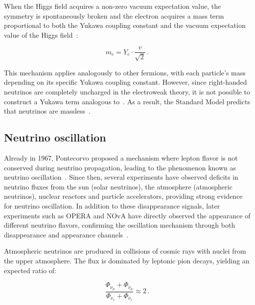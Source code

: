 When the Higgs field acquires a non-zero vacuum expectation value, the symmetry is spontaneously broken and the electron acquires a mass term proportional to both the Yukawa coupling constant and the vacuum expectation value of the Higgs field~\cite{bilenkij_introduction_2018, navas_review_2024}:

\begin{equation} 
\label{eq:electron_mass}
		m_e = Y_e \cdot \frac{v}{\sqrt{2}} \,.
\end{equation}


This mechanism applies analogously to other fermions, with each particle's mass depending on its specific Yukawa coupling constant. However, since right-handed neutrinos are completely uncharged in the electroweak theory, it is not possible to construct a Yukawa term analogous to~. As a result, the Standard Model predicts that neutrinos are massless~\cite{navas_review_2024}. 

\subsection{Neutrino oscillation}

Already in 1967, Pontecorvo proposed a mechanism where lepton flavor is not conserved during neutrino propagation, leading to the phenomenon known as neutrino oscillation~\cite{pontecorvo_neutrino_1968}. Since then, several experiments have observed deficits in neutrino fluxes from the sun (solar neutrinos), the atmosphere (atmospheric neutrinos), nuclear reactors and particle accelerators, providing strong evidence for neutrino oscillation. In addition to these disappearance signals, later experiments such as OPERA and NOvA have directly observed the appearance of different neutrino flavors, confirming the oscillation mechanism through both disappearance and appearance channels~\cite{opera_neutrino_2019, Acero_nova_2022}.

Atmospheric neutrinos are produced in collisions of cosmic rays with nuclei from the upper atmosphere. The flux is dominated by leptonic pion decays, yielding an expected ratio of:

\begin{equation}
\label{eq:Neurino_flux_ratio}
    \frac{\Phi_{\nu_\mu} + \Phi_{\overline{\nu}_{\mu}}}{\Phi_{\nu_e} + \Phi_{\overline{\nu}_e}} \approx 2 \,.
\end{equation}

